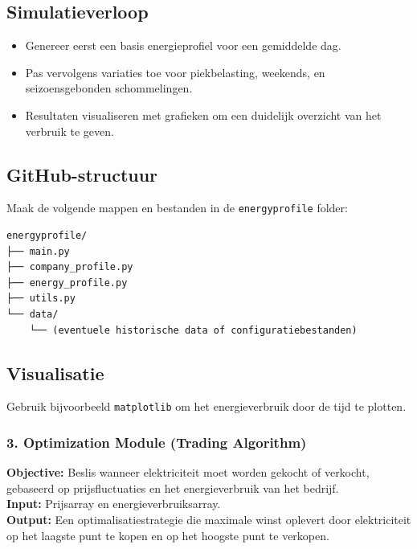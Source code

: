 \subsection{Simulatieverloop}
\begin{itemize}
    \item Genereer eerst een basis energieprofiel voor een gemiddelde dag.
    \item Pas vervolgens variaties toe voor piekbelasting, weekends, en seizoensgebonden schommelingen.
    \item Resultaten visualiseren met grafieken om een duidelijk overzicht van het verbruik te geven.
\end{itemize}

\subsection{GitHub-structuur}
Maak de volgende mappen en bestanden in de \texttt{energyprofile} folder:

\begin{verbatim}
energyprofile/
├── main.py
├── company_profile.py
├── energy_profile.py
├── utils.py
└── data/
    └── (eventuele historische data of configuratiebestanden)
\end{verbatim}

\subsection{Visualisatie}
Gebruik bijvoorbeeld \texttt{matplotlib} om het energieverbruik door de tijd te plotten.



\subsubsection{3. Optimization Module (Trading Algorithm)}
\textbf{Objective:} Beslis wanneer elektriciteit moet worden gekocht of verkocht, gebaseerd op prijsfluctuaties en het energieverbruik van het bedrijf. \\
\textbf{Input:} Prijsarray en energieverbruiksarray. \\
\textbf{Output:} Een optimalisatiestrategie die maximale winst oplevert door elektriciteit op het laagste punt te kopen en op het hoogste punt te verkopen.
